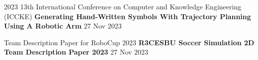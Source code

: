 
\begin{cventries}
    \cventry
    {2023 13th International Conference on Computer and Knowledge Engineering (ICCKE)}
    {\textbf {Generating Hand-Written Symbols With Trajectory Planning Using A Robotic Arm}}
    {}
    {27 Nov 2023}
    {}
    \vspace{0.2 cm}

    
\end{cventries}

\begin{cventries}
    \cventry
    {Team Description Paper for RoboCup 2023}
    {\textbf {R3CESBU Soccer Simulation 2D Team Description Paper 2023}}
    {}
    {27 Nov 2023}
    {}
    \vspace{0.35 cm}
\end{cventries}

\vspace{0.5 cm}
